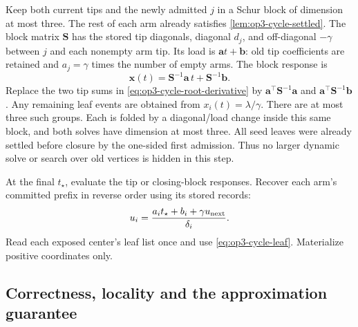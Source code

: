 Keep both current tips and the newly admitted $j$ in a Schur block of
dimension at most three. The rest of each arm already satisfies
\cref{lem:op3-cycle-settled}. The block matrix $\bm S$ has the stored tip
diagonals, diagonal $d_j$, and off-diagonal $-\gamma$ between $j$ and
each nonempty arm tip. Its load is $\bm a t+\bm b$: old tip coefficients
are retained and $a_j=\gamma$ times the number of empty arms. The block
response is
\[
 \bm x(t)=\bm S^{-1}\bm a\,t+\bm S^{-1}\bm b.
\]
Replace the two tip sums in \cref{eq:op3-cycle-root-derivative} by
$\bm a^\top\bm S^{-1}\bm a$ and
$\bm a^\top\bm S^{-1}\bm b$. Any remaining leaf events are obtained from
$x_i(t)=\lambda/\gamma$. There are at most three such groups. Each is
folded by a diagonal/load change inside this same block, and both solves
have dimension at most three. All seed leaves were already settled before
closure by the one-sided first admission. Thus no larger dynamic solve or
search over old vertices is hidden in this step.

At the final $t_\star$, evaluate the tip or closing-block responses. Recover
each arm's committed prefix in reverse order using its stored records:
\begin{equation}
 u_i=\frac{a_i t_\star+b_i+\gamma u_{\rm next}}{\delta_i}.
 \label{eq:op3-cycle-reverse}
\end{equation}
Read each exposed center's leaf list once and use
\cref{eq:op3-cycle-leaf}. Materialize positive coordinates only.

\subsection{Correctness, locality and the approximation guarantee}

